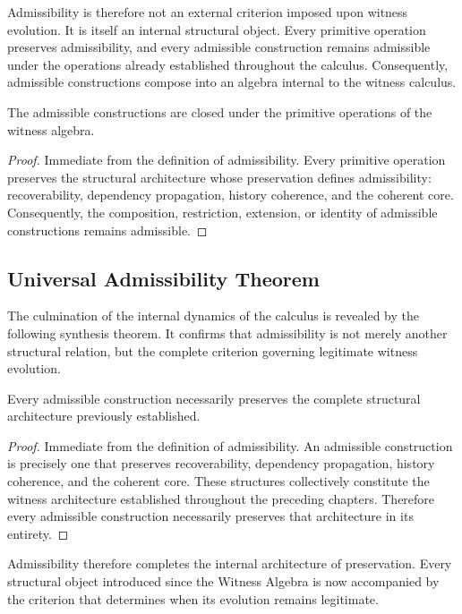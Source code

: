 \documentclass[12pt,anyside]{book}
\begin{document}
Admissibility is therefore not an external criterion imposed upon witness evolution. It is itself an internal structural object. Every primitive operation preserves admissibility, and every admissible construction remains admissible under the operations already established throughout the calculus. Consequently, admissible constructions compose into an algebra internal to the witness calculus.

\begin{theorem}
The admissible constructions are closed under the primitive operations of the witness algebra.
\end{theorem}
\begin{proof}
Immediate from the definition of admissibility. Every primitive operation preserves the structural architecture whose preservation defines admissibility: recoverability, dependency propagation, history coherence, and the coherent core. Consequently, the composition, restriction, extension, or identity of admissible constructions remains admissible.
\end{proof}

\subsection{Universal Admissibility Theorem}
The culmination of the internal dynamics of the calculus is revealed by the following synthesis theorem. It confirms that admissibility is not merely another structural relation, but the complete criterion governing legitimate witness evolution.

\begin{theorem}
Every admissible construction necessarily preserves the complete structural architecture previously established.
\end{theorem}
\begin{proof}
Immediate from the definition of admissibility. An admissible construction is precisely one that preserves recoverability, dependency propagation, history coherence, and the coherent core. These structures collectively constitute the witness architecture established throughout the preceding chapters. Therefore every admissible construction necessarily preserves that architecture in its entirety.
\end{proof}

Admissibility therefore completes the internal architecture of preservation. Every structural object introduced since the Witness Algebra is now accompanied by the criterion that determines when its evolution remains legitimate.
\end{document}
